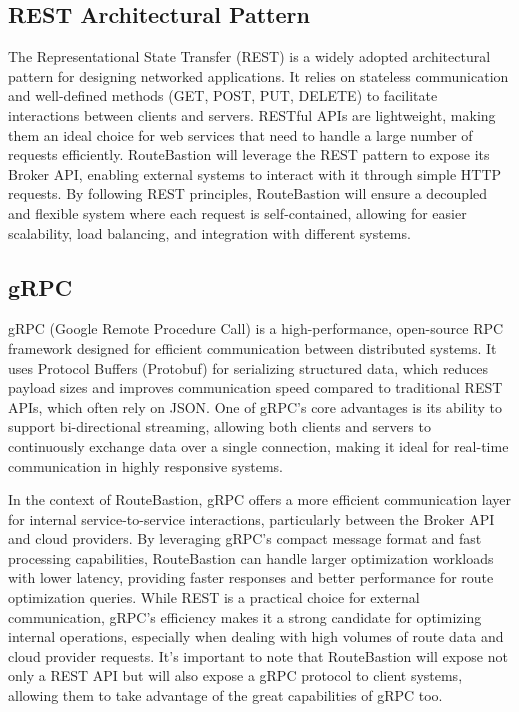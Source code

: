 \documentclass[english,notblind]{sbc20}
\begin{document}
\subsection{REST Architectural Pattern}
\label{subsec:rest}
The Representational State Transfer (REST) is a widely adopted architectural pattern for designing networked applications. It relies on stateless communication and well-defined methods (GET, POST, PUT, DELETE) to facilitate interactions between clients and servers. RESTful APIs are lightweight, making them an ideal choice for web services that need to handle a large number of requests efficiently. RouteBastion will leverage the REST pattern to expose its Broker API, enabling external systems to interact with it through simple HTTP requests. By following REST principles, RouteBastion will ensure a decoupled and flexible system where each request is self-contained, allowing for easier scalability, load balancing, and integration with different systems.

\subsection{gRPC}
\label{subsec:grpc}
gRPC (Google Remote Procedure Call) \cite{grpc} is a high-performance, open-source RPC framework designed for efficient communication between distributed systems. It uses Protocol Buffers (Protobuf) for serializing structured data, which reduces payload sizes and improves communication speed compared to traditional REST APIs, which often rely on JSON. One of gRPC's core advantages is its ability to support bi-directional streaming, allowing both clients and servers to continuously exchange data over a single connection, making it ideal for real-time communication in highly responsive systems.

In the context of RouteBastion, gRPC offers a more efficient communication layer for internal service-to-service interactions, particularly between the Broker API and cloud providers. By leveraging gRPC's compact message format and fast processing capabilities, RouteBastion can handle larger optimization workloads with lower latency, providing faster responses and better performance for route optimization queries. While REST is a practical choice for external communication, gRPC's efficiency makes it a strong candidate for optimizing internal operations, especially when dealing with high volumes of route data and cloud provider requests. It's important to note that RouteBastion will expose not only a REST API but will also expose a gRPC protocol to client systems, allowing them to take advantage of the great capabilities of gRPC too.
\end{document}
